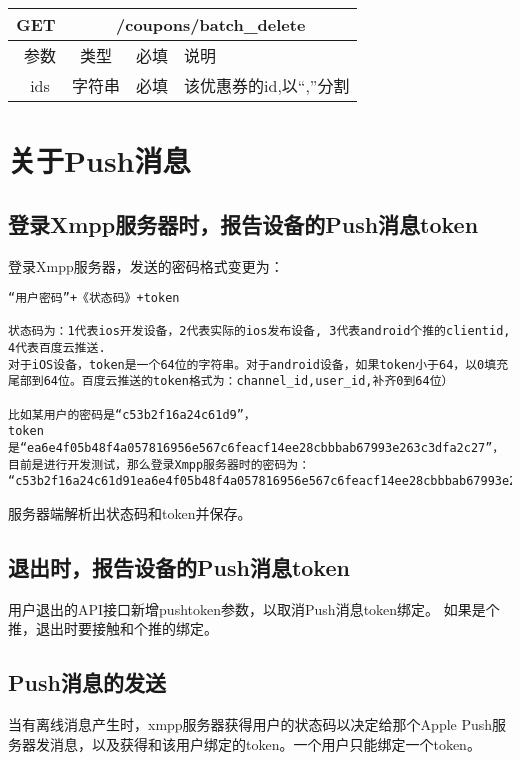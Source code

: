 \begin{table}[H]
   \begin{center}
\begin{tabular}{|c|c|c|p{12cm}|}
\hline
GET & \multicolumn{3}{|c|}{/coupons/batch\_delete} \\
\hline\hline
 \  参数  & 类型 & 必填 &  说明  \\
\hline
 \  ids  & 字符串 & 必填 &  该优惠券的id,以“,”分割  \\
\hline
\end{tabular}
   \end{center}
\end{table}





\section{关于Push消息}

\subsection{登录Xmpp服务器时，报告设备的Push消息token}
登录Xmpp服务器，发送的密码格式变更为：

\begin{verbatim}
“用户密码”+《状态码》+token

状态码为：1代表ios开发设备，2代表实际的ios发布设备, 3代表android个推的clientid, 4代表百度云推送.
对于iOS设备，token是一个64位的字符串。对于android设备，如果token小于64，以0填充尾部到64位。百度云推送的token格式为：channel_id,user_id,补齐0到64位）

比如某用户的密码是“c53b2f16a24c61d9”，
token是“ea6e4f05b48f4a057816956e567c6feacf14ee28cbbbab67993e263c3dfa2c27”，
目前是进行开发测试，那么登录Xmpp服务器时的密码为：
“c53b2f16a24c61d91ea6e4f05b48f4a057816956e567c6feacf14ee28cbbbab67993e263c3dfa2c27”。
\end{verbatim}

服务器端解析出状态码和token并保存。


\subsection{退出时，报告设备的Push消息token}

用户退出的API接口新增pushtoken参数，以取消Push消息token绑定。
如果是个推，退出时要接触和个推的绑定。

\subsection{Push消息的发送}
当有离线消息产生时，xmpp服务器获得用户的状态码以决定给那个Apple Push服务器发消息，以及获得和该用户绑定的token。一个用户只能绑定一个token。
